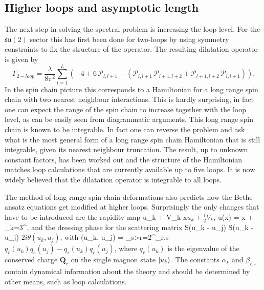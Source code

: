 \subsection{Higher loops and asymptotic length}

The next step in solving the spectral problem is increasing the loop level. 
For the $\mathfrak{su}(2)$ sector this has first been done for two-loops by using symmetry constraints to fix the structure of the operator. 
The resulting dilatation operator is given by \cite{Beisert:2003tq}
\begin{equation}
	\Gamma_{2-loop} = \frac{\lambda}{8\pi^2}\sum_{l=1}^L \left(-4 + 6 \, \mathcal{P}_{l,l+1} - \left( \mathcal{P}_{l,l+1} \, \mathcal{P}_{l+1,l+2} + \mathcal{P}_{l+1,l+2} \, \mathcal{P}_{l,l+1} \right) \right).
\end{equation}
In the spin chain picture this corresponds to a Hamiltonian for a long range spin chain with two nearest neighbour interactions. 
This is hardly surprising, in fact one can expect the range of the spin chain to increase together with the loop level, as can be easily seen from diagrammatic arguments.
This long range spin chain is known to be integrable.
In fact one can reverse the problem and ask what is the most general form of a long range spin chain Hamiltonian that is still integrable, given its nearest neighbour truncation. 
The result, up to unknown constant factors, has been worked out \cite{Bargheer:2009xy} and the structure of the Hamiltonian matches loop calculations that are currently available up to five loops. 
It is now widely believed that the dilatation operator is integrable to all loops.

The method of long range spin chain deformations also predicts how the Bethe ansatz equations get modified at higher loops. 
Surprisingly the only changes that have to be introduced are the rapidity map
\beq
	u_k +  V_k \rightarrow x\(u_k + \frac{i}{2} V_k\), \;\;\; u(x) = x + \sum_{k=3}^\infty {},
\eeq
and the dressing phase for the scattering matrix
\beq
	\label{eq:deformed_dressing}
	S(u_k - u_j) \rightarrow S(u_k - u_j) \exp\( 2i\theta(u_k, u_j) \),
\eeq
with
\beq
	\label{eq:bes_phase}
	\theta(u_k, u_j) = \sum_{s>r=2}^\infty \beta_{r,s} \( q_r(u_k)q_s(u_j) - q_s(u_k)q_r(u_j) \),
\eeq
where $q_r(u_k)$ is the eigenvalue of the conserved charge $\mathbf{Q}_r$ on the single magnon state $|u_k\rangle$.
The constants $\alpha_k$ and $\beta_{r,s}$ contain dynamical information about the theory and should be determined by other means, such as loop calculations.

